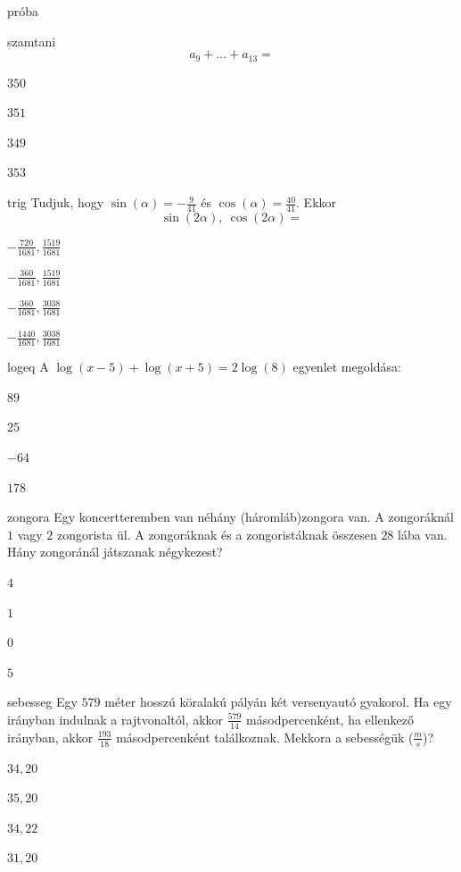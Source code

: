 \documentclass[12pt]{article}
\begin{document}
\begin{quiz}{próba}
\begin{multi}{szamtani}
$$
a_{9}+\ldots +a_{13}=
$$
\item* $350$
\item  $351$
\item  $349$
\item  $353$
\end{multi}
\begin{multi}{trig}
Tudjuk, hogy $ \sin(\alpha) =-\frac{9}{41}$ és $ \cos(\alpha) = \frac{40}{41} $. 
Ekkor $$ \sin(2\alpha),\ \cos(2\alpha)=$$
\item* $ -\frac{720}{1681}, \frac{1519}{1681} $
\item  $ -\frac{360}{1681}, \frac{1519}{1681} $
\item  $ -\frac{360}{1681}, \frac{3038}{1681} $
\item  $ -\frac{1440}{1681}, \frac{3038}{1681} $
\end{multi}
\begin{multi}{logeq}
A $ \log(x-5)+\log(x+5)=2\log(8) $ egyenlet megoldása:
\item* $ 89  $
\item  $ 25 $
\item  $ -64 $
\item  $ 178 $
\end{multi}
\begin{multi}{zongora}
Egy koncertteremben van néhány (háromláb)zongora van. A zongoráknál 
$1$ vagy $2$ zongorista ül. A zongoráknak és a zongoristáknak összesen $28$ 
lába van. Hány zongoránál játszanak négykezest?
\item* $ 4  $
\item  $ 1 $
\item  $ 0 $
\item  $ 5 $
\end{multi}
\begin{multi}{sebesseg}
Egy $579$ méter hosszú köralakú pályán két versenyautó gyakorol. Ha egy irányban 
indulnak a rajtvonaltól, akkor $\frac{579}{14}$ másodpercenként, ha ellenkező irányban, akkor 
$\frac{193}{18}$ másodpercenként találkoznak. Mekkora a sebességük ($\frac{m}{s}$)?
\item* $ 34, 20  $
\item  $ 35, 20 $
\item  $ 34, 22 $
\item  $ 31, 20 $
\end{multi}
\end{quiz}
\end{document}

